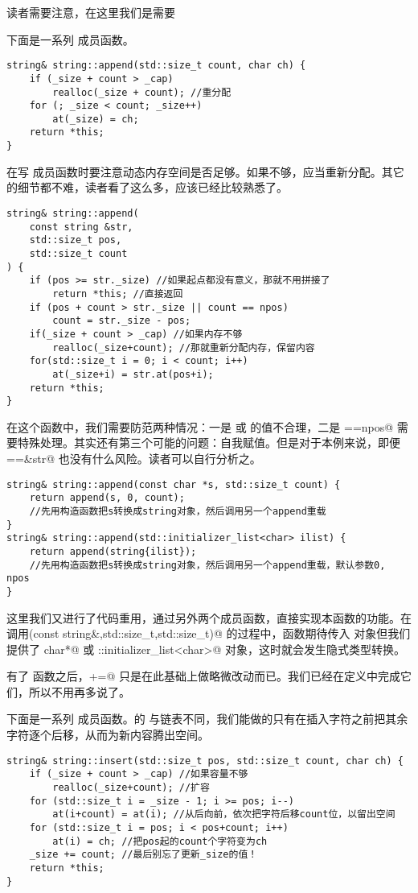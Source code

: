 读者需要注意，在这里我们是需要\par
下面是一系列 \lstinline@append@ 成员函数。
\begin{lstlisting}
string& string::append(std::size_t count, char ch) {
    if (_size + count > _cap)
        realloc(_size + count); //重分配
    for (; _size < count; _size++)
        at(_size) = ch;
    return *this;
}
\end{lstlisting}
在写 \lstinline@append@ 成员函数时要注意动态内存空间是否足够。如果不够，应当重新分配。其它的细节都不难，读者看了这么多，应该已经比较熟悉了。
\begin{lstlisting}
string& string::append(
    const string &str,
    std::size_t pos,
    std::size_t count
) {
    if (pos >= str._size) //如果起点都没有意义，那就不用拼接了
        return *this; //直接返回
    if (pos + count > str._size || count == npos)
        count = str._size - pos;
    if(_size + count > _cap) //如果内存不够
        realloc(_size+count); //那就重新分配内存，保留内容
    for(std::size_t i = 0; i < count; i++)
        at(_size+i) = str.at(pos+i);
    return *this;
}
\end{lstlisting}
在这个函数中，我们需要防范两种情况：一是 \lstinline@pos@ 或 \lstinline@count@ 的值不合理，二是 \lstinline@count==npos@ 需要特殊处理。其实还有第三个可能的问题：自我赋值。但是对于本例来说，即便 \lstinline@this==&str@ 也没有什么风险。读者可以自行分析之。
\begin{lstlisting}
string& string::append(const char *s, std::size_t count) {
    return append(s, 0, count);
    //先用构造函数把s转换成string对象，然后调用另一个append重载
}
string& string::append(std::initializer_list<char> ilist) {
    return append(string{ilist});
    //先用构造函数把s转换成string对象，然后调用另一个append重载，默认参数0, npos
}
\end{lstlisting}
这里我们又进行了代码重用，通过另外两个成员函数，直接实现本函数的功能。在调用\newline\lstinline@append(const string&,std::size_t,std::size_t)@ 的过程中，函数期待传入 \lstinline@string@ 对象但我们提供了 \lstinline@const char*@ 或 \lstinline@std::initializer_list<char>@ 对象，这时就会发生隐式类型转换。\par
有了 \lstinline@append@ 函数之后，\lstinline@operator+=@ 只是在此基础上做略微改动而已。我们已经在定义中完成它们，所以不用再多说了。\par
下面是一系列 \lstinline@insert@ 成员函数。\lstinline@string@ 的 \lstinline@insert@ 与链表不同，我们能做的只有在插入字符之前把其余字符逐个后移，从而为新内容腾出空间。
\begin{lstlisting}
string& string::insert(std::size_t pos, std::size_t count, char ch) {
    if (_size + count > _cap) //如果容量不够
        realloc(_size+count); //扩容
    for (std::size_t i = _size - 1; i >= pos; i--)
        at(i+count) = at(i); //从后向前，依次把字符后移count位，以留出空间
    for (std::size_t i = pos; i < pos+count; i++)
        at(i) = ch; //把pos起的count个字符变为ch
    _size += count; //最后别忘了更新_size的值！
    return *this;
}
\end{lstlisting}
